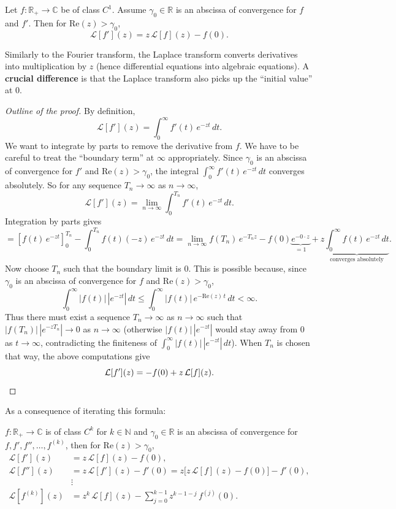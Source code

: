 \begin{theorem}
Let $f : \mathbb{R}_+ \to \mathbb{C}$ be of class $C^1$. Assume $\gamma_0 \in \mathbb{R}$ is an abscissa of convergence for $f$ and $f'$. Then for $\mathrm{Re}(z) > \gamma_0$,
\[
\boxed{\mathcal{L}[f'](z) = z\,\mathcal{L}[f](z) - f(0).}
\]
\end{theorem}

\begin{remark}
Similarly to the Fourier transform, the Laplace transform converts derivatives into multiplication by $z$ (hence differential equations into algebraic equations). A \textbf{crucial difference} is that the Laplace transform also picks up the ``initial value'' at $0$.
\end{remark}

\begin{proof}[Outline of the proof]
By definition,
\[
\mathcal{L}[f'](z) = \int_0^{\infty} f'(t)\,e^{-zt}\,dt.
\]
We want to integrate by parts to remove the derivative from $f$. We have to be careful to treat the ``boundary term'' at $\infty$ appropriately. Since $\gamma_0$ is an abscissa of convergence for $f'$ and $\mathrm{Re}(z) > \gamma_0$, the integral $\int_0^{\infty} f'(t)\,e^{-zt}\,dt$ converges absolutely. So for any sequence $T_n \to \infty$ as $n \to \infty$,
\[
\mathcal{L}[f'](z) = \lim_{n \to \infty}\int_0^{T_n} f'(t)\,e^{-zt}\,dt.
\]
Integration by parts gives
\[
= \left[f(t)\,e^{-zt}\right]_0^{T_n} - \int_0^{T_n} f(t)(-z)\,e^{-zt}\,dt
= \lim_{n \to \infty} f(T_n)\,e^{-T_n z} - f(0)\underbrace{e^{-0\cdot z}}_{=1} + z \underbrace{\int_0^{\infty} f(t)\,e^{-zt}\,dt}_{\text{converges absolutely}}.
\]
Now choose $T_n$ such that the boundary limit is $0$. This is possible because, since $\gamma_0$ is an abscissa of convergence for $f$ and $\mathrm{Re}(z) > \gamma_0$,
\[
\int_0^{\infty} |f(t)|\,|e^{-zt}|\,dt \leq \int_0^{\infty} |f(t)|\,e^{-\mathrm{Re}(z)\,t}\,dt < \infty.
\]
Thus there must exist a sequence $T_n \to \infty$ as $n \to \infty$ such that $|f(T_n)|\,|e^{-zT_n}| \to 0$ as $n \to \infty$ (otherwise $|f(t)|\,|e^{-zt}|$ would stay away from $0$ as $t \to \infty$, contradicting the finiteness of $\int_0^{\infty} |f(t)|\,|e^{-zt}|\,dt$). When $T_n$ is chosen that way, the above computations give
\[
\mathcal{L}[f'](z) = -f(0) + z\,\mathcal{L}[f](z). \qedhere
\]
\end{proof}

As a consequence of iterating this formula: 
\begin{corollary}
$f : \mathbb{R}_+ \to \mathbb{C}$ is of class $C^k$ for $k \in \mathbb{N}$ and $\gamma_0 \in \mathbb{R}$ is an abscissa of convergence for $f, f', f'', \dots, f^{(k)}$, then for $\mathrm{Re}(z) > \gamma_0$,
\[
\begin{aligned}
\mathcal{L}[f'](z) &= z\,\mathcal{L}[f](z) - f(0), \\
\mathcal{L}[f''](z) &= z\,\mathcal{L}[f'](z) - f'(0) = z\bigl[z\,\mathcal{L}[f](z) - f(0)\bigr] - f'(0), \\
&\vdots \\
\mathcal{L}[f^{(k)}](z) &= z^k\,\mathcal{L}[f](z) - \sum_{j=0}^{k-1} z^{k-1-j}\,f^{(j)}(0).
\end{aligned}
\]

\end{corollary}
